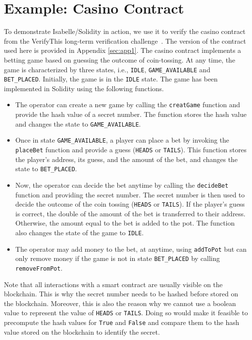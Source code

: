 \documentclass[a4paper,UKenglish,cleveref, autoref, thm-restate]{oasics-v2021}
\begin{document}
\section{Example: Casino Contract}
To demonstrate Isabelle/Solidity in action, we use it to verify the casino contract from the VerifyThis long-term verification challenge~\cite{verifythis:casino}.
The version of the contract used here is provided in Appendix \ref{sec:app1}.
%
The casino contract implements a betting game based on guessing the outcome of coin-tossing.
%
At any time, the game is characterized by three states, i.e., \texttt{IDLE}, \texttt{GAME\_AVAILABLE} and \texttt{BET\_PLACED}.
%
Initially, the game is in the \texttt{IDLE} state.
%
The game has been implemented in Solidity using the following functions.
%
\begin{itemize}
\item The operator can create a new game by calling the \texttt{creatGame} function and provide the hash value of a secret number. 
The function stores the hash value and changes the state to \texttt{GAME\_AVAILABLE}.
%
\item Once in state \texttt{GAME\_AVAILABLE}, a player can place a bet by invoking the \texttt{placeBet} function and provide a guess (\texttt{HEADS} or \texttt{TAILS}).
This function stores the player's address, its guess, and the amount of the bet, and changes the state to \texttt{BET\_PLACED}.
%
\item Now, the operator can decide the bet anytime by calling the \texttt{decideBet} function and providing the secret number.
The secret number is then used to decide the outcome of the coin tossing (\texttt{HEADS} or \texttt{TAILS}).
If the player's guess is correct, the double of the amount of the bet is transferred to their address.
Otherwise, the amount equal to the bet is added to the pot.
The function also changes the state of the game to \texttt{IDLE}.
%
\item The operator may add money to the bet, at anytime, using \texttt{addToPot} but can only remove money if the game is not in state \texttt{BET\_PLACED} by calling \texttt{removeFromPot}.
\end{itemize}
%
Note that all interactions with a smart contract are usually visible on the blockchain.
This is why the secret number needs to be hashed before stored on the blockchain.
Moreover, this is also the reason why we cannot use a boolean value to represent the value of \texttt{HEADS} or \texttt{TAILS}.
Doing so would make it feasible to precompute the hash values for \texttt{True} and \texttt{False}
and compare them to the hash value stored on the blockchain to identify the secret.
\end{document}
